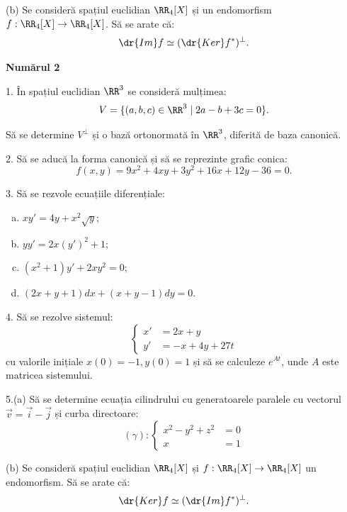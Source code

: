 (b) Se consideră spațiul euclidian $ \RR_4[X] $ și un endomorfism
$ f : \RR_4[X] \to \RR_4[X] $. Să se arate că:
\[
  \dr{Im}f \simeq (\dr{Ker}f^\ast)^\perp.
\]



\textbf{Numărul 2}

1. În spațiul euclidian $ \RR^3 $ se consideră mulțimea:
\[
  V = \{(a, b, c) \in \RR^3 \mid 2a - b + 3c = 0 \}.
\]

Să se determine $ V^\perp $ și o bază ortonormată în $ \RR^3 $, diferită
de baza canonică.

\vspace{1cm}


2. Să se aducă la forma canonică și să se reprezinte grafic conica:
\[
  f(x, y) = 9x^2 + 4xy + 3y^2 + 16x + 12y - 36 = 0.
\]

\vspace{1cm}

3. Să se rezvole ecuațiile diferențiale:
\begin{enumerate}[(a)]
  \item $ xy' = 4y + x^2 \sqrt{y} $;
  \item $ yy' = 2x(y')^2 + 1 $;
  \item $ (x^2 + 1)y' + 2xy^2 = 0 $;
  \item $ (2x + y + 1)dx + (x + y - 1) dy = 0 $.
\end{enumerate}


\vspace{1cm}

4. Să se rezolve sistemul:
\[
  \begin{cases}
    x' &= 2x + y \\
    y' &= -x + 4y + 27t
  \end{cases}
\]
cu valorile inițiale $ x(0) = -1, y(0) = 1 $ și să se calculeze
$ e^{At} $, unde $ A $ este matricea sistemului.

\vspace{1cm}

5.(a) Să se determine ecuația cilindrului cu generatoarele paralele
cu vectorul $ \vec{v} = \vec{i} - \vec{j} $ și curba directoare:
\[
  (\gamma): %
  \begin{cases}
    x^2 - y^2 + z^2 &= 0 \\
    x &= 1
  \end{cases}
\]

(b) Se consideră spațiul euclidian $ \RR_4[X] $ și $f : \RR_4[X] \to \RR_4[X] $
un endomorfism. Să se arate că:
\[
  \dr{Ker}f \simeq (\dr{Im}f^\ast)^\perp.
\]


